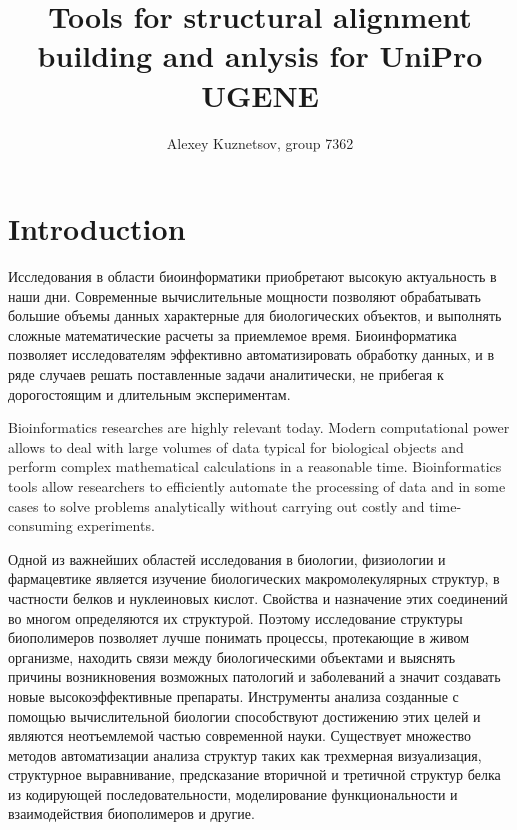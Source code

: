 \documentclass[a4paper, 12pt, titlepage, utf8]{extarticle}
\author{Alexey Kuznetsov, group 7362}
\title{Tools for structural alignment building and anlysis for UniPro UGENE}
\let\oldsection\section         %
\renewcommand{\section}{\newpage\oldsection}
\begin{document}


\tableofcontents
\newpage

\section{Introduction}      %
\begin{original}
Исследования в области биоинформатики приобретают высокую актуальность в наши
дни.
Современные вычислительные мощности позволяют обрабатывать большие объемы данных
характерные для биологических объектов, и выполнять сложные математические
расчеты за приемлемое время. Биоинформатика позволяет исследователям эффективно
автоматизировать обработку данных, и в ряде случаев решать поставленные задачи
аналитически, не прибегая к дорогостоящим и длительным экспериментам.
\end{original}

Bioinformatics researches are highly relevant today.
Modern computational power allows to deal with large volumes of data typical for
biological objects and perform complex mathematical calculations in a
reasonable time. Bioinformatics tools allow researchers to efficiently automate
the processing of data and in some cases to solve problems analytically
without carrying out costly and time-consuming experiments.

\begin{original}
Одной из важнейших областей исследования в биологии, физиологии и фармацевтике
является изучение биологических макромолекулярных структур, в частности белков и
нуклеиновых кислот. Свойства и назначение этих соединений во многом определяются
их структурой. Поэтому исследование структуры биополимеров позволяет лучше
понимать процессы, протекающие в живом организме, находить связи между
биологическими объектами и выяснять причины возникновения возможных патологий и
заболеваний а значит создавать новые высокоэффективные препараты. Инструменты
анализа созданные с помощью вычислительной биологии способствуют достижению этих
целей и являются неотъемлемой частью современной науки. Существует множество
методов автоматизации анализа структур таких как трехмерная визуализация,
структурное выравнивание, предсказание вторичной и третичной структур белка из
кодирующей последовательности, моделирование функциональности и взаимодействия
биополимеров и другие.
\end{original}
\end{document}
